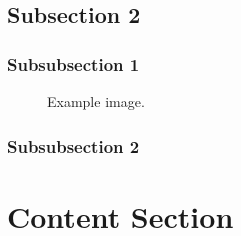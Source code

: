 \documentclass[12pt]{article} %
\begin{document}
\lipsum[1] %


\subsection{Subsection 2} %

\lipsum[2] %


\subsubsection{Subsubsection 1} %

\lipsum[3] %

\begin{figure}[H] %
\caption{Example image.}
\label{fig:speciation}
\end{figure}


\subsubsection{Subsubsection 2} %

\lipsum[4] %


\section{Content Section} %

\lipsum[5] %

\end{document}
